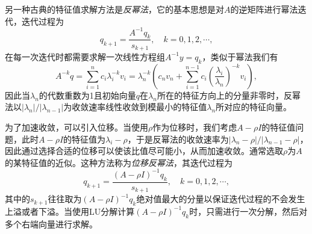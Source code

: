\documentclass[a4paper,10pt]{ctexart}
\begin{document}
另一种古典的特征值求解方法是\emph{反幂法}，它的基本思想是对$ A $的逆矩阵进行幂法迭代，迭代过程为
\begin{equation}
    q_{k+1} = \frac{A^{-1}q_k}{s_{k+1}},\quad k = 0,1,2,\cdots,
\end{equation}
在每一次迭代时都需要求解一次线性方程组$ A^{-1}y = q_k $，类似于幂法我们有
\[
    A^{-k}q = \sum_{i=1}^{n}c_i \lambda_i^{-k} v_i = \lambda_n^{-k} \left( c_n v_n + \sum_{i=1}^{n-1}c_i \left( \frac{\lambda_i}{\lambda_n} \right)^{-k} v_i \right),
\]
因此当$ \lambda_n $的代数重数为1且初始向量$ q $在$ \lambda_n $所在的特征方向上的分量非零时，反幂法以$ |\lambda_n|/|\lambda_{n-1}| $为收敛速率线性收敛到模最小的特征值$ \lambda_n $所对应的特征向量。

为了加速收敛，可以引入位移。当使用$ \rho $作为位移时，我们考虑$ A-\rho I $的特征值问题，此时$ A-\rho I $的特征值为$ \lambda_i-\rho $，于是反幂法的收敛速率为$ |\lambda_n-\rho|/|\lambda_{n-1}-\rho| $，因此通过选择合适的位移可以使该比值尽可能小，从而加速收敛。通常选取$ \rho $为$ A $的某特征值的近似。这种方法称为\emph{位移反幂法}，其迭代过程为
\begin{equation}
    q_{k+1} = \frac{(A-\rho I)^{-1}q_k}{s_{k+1}},\quad k = 0,1,2,\cdots,
\end{equation}
其中的$ s_{k+1} $往往取为$ (A-\rho I)^{-1}q_k $绝对值最大的分量以保证迭代过程的不会发生上溢或者下溢。当使用LU分解计算$ (A-\rho I)^{-1}q_k $时，只需进行一次分解，然后对多个右端向量进行求解。
\end{document}
